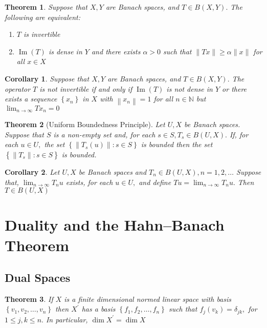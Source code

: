 \documentclass[10pt]{paper}
\newtheorem{theorem}{Theorem}[section]
\newtheorem{corollary}{Corollary}[section]
\begin{document}
\begin{theorem}
    Suppose that $X, Y$ are Banach spaces, and $T \in B(X, Y) .$ The following are equivalent:
    \begin{enumerate}
        \item $T$ is invertible
        \item $\operatorname{Im}(T)$ is dense in $Y$ and there exists $\alpha>0$ such that $\|T x\| \geq \alpha\|x\|$ for all $x \in X$
    \end{enumerate}
\end{theorem}

\begin{corollary}
    Suppose that $X, Y$ are Banach spaces, and $T \in B(X, Y) .$ The operator $T$ is not invertible if and only if $\operatorname{Im}(T)$ is not dense in $Y$ or there exists a sequence $\left\{x_{n}\right\}$ in $X$ with $\left\|x_{n}\right\|=1$ for all $n \in \mathbb{N}$ but $\lim _{n \rightarrow \infty} T x_{n}=0$
\end{corollary}

\begin{theorem}[Uniform Boundedness Principle]
    Let $U, X$ be Banach spaces. Suppose that $S$ is a non-empty set and, for each $s \in S, T_{s} \in B(U, X) .$ If, for each $u \in U,$ the set $\left\{\left\|T_{s}(u)\right\|: s \in S\right\}$ is bounded then the set $\left\{\left\|T_{s}\right\|: s \in S\right\}$ is bounded.
\end{theorem}

\begin{corollary}
    Let $U, X$ be Banach spaces and $T_{n} \in B(U, X), n=1,2, \ldots$ Suppose that, $\lim _{n \rightarrow \infty} T_{n} u$ exists, for each $u \in U,$ and define $T u=\lim _{n \rightarrow \infty} T_{n} u .$ Then $T \in B(U, X)$
\end{corollary}

\section{Duality and the Hahn–Banach Theorem}

\subsection{Dual Spaces}

\begin{theorem}
    If $X$ is a finite dimensional normed linear space with basis $\left\{v_{1}, v_{2}, \ldots, v_{n}\right\}$ then $X^{\prime}$ has a basis $\left\{f_{1}, f_{2}, \ldots, f_{n}\right\}$ such that $f_{j}\left(v_{k}\right)=\delta_{j k},$ for $1 \leq j, k \leq n .$ In particular, $\operatorname{dim} X^{\prime}=\operatorname{dim} X$
\end{theorem}
\end{document}

